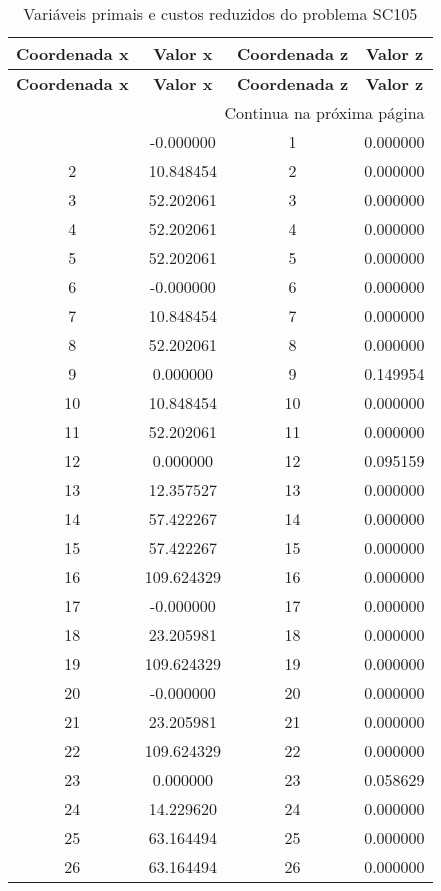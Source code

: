 \documentclass[12pt]{article}
\begin{document}
\begin{longtable}{@{}cccc@{}}
\caption{Variáveis primais e custos reduzidos do problema SC105} \\
\toprule
\textbf{Coordenada x} & \textbf{Valor x} & \textbf{Coordenada z} & \textbf{Valor z} \\
\midrule
\endfirsthead

\toprule
\textbf{Coordenada x} & \textbf{Valor x} & \textbf{Coordenada z} & \textbf{Valor z} \\
\midrule
\endhead

\midrule \multicolumn{4}{r}{{Continua na próxima página}} \\ \midrule
\endfoot

\bottomrule
\endlastfoot
1 & -0.000000 & 1 & 0.000000 \\
2 & 10.848454 & 2 & 0.000000 \\
3 & 52.202061 & 3 & 0.000000 \\
4 & 52.202061 & 4 & 0.000000 \\
5 & 52.202061 & 5 & 0.000000 \\
6 & -0.000000 & 6 & 0.000000 \\
7 & 10.848454 & 7 & 0.000000 \\
8 & 52.202061 & 8 & 0.000000 \\
9 & 0.000000 & 9 & 0.149954 \\
10 & 10.848454 & 10 & 0.000000 \\
11 & 52.202061 & 11 & 0.000000 \\
12 & 0.000000 & 12 & 0.095159 \\
13 & 12.357527 & 13 & 0.000000 \\
14 & 57.422267 & 14 & 0.000000 \\
15 & 57.422267 & 15 & 0.000000 \\
16 & 109.624329 & 16 & 0.000000 \\
17 & -0.000000 & 17 & 0.000000 \\
18 & 23.205981 & 18 & 0.000000 \\
19 & 109.624329 & 19 & 0.000000 \\
20 & -0.000000 & 20 & 0.000000 \\
21 & 23.205981 & 21 & 0.000000 \\
22 & 109.624329 & 22 & 0.000000 \\
23 & 0.000000 & 23 & 0.058629 \\
24 & 14.229620 & 24 & 0.000000 \\
25 & 63.164494 & 25 & 0.000000 \\
26 & 63.164494 & 26 & 0.000000 \\

\end{longtable}
\end{document}
